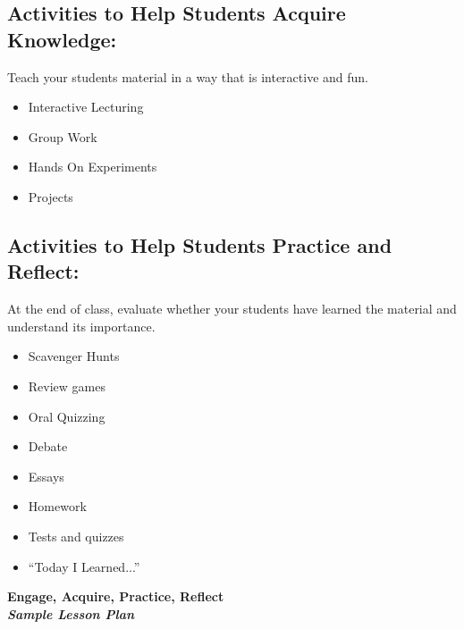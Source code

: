 \subsection{Activities to Help Students Acquire Knowledge:}
Teach your students material in a way that is interactive and fun.  
\begin{itemize}
 \item Interactive Lecturing
 \item Group Work
 \item Hands On Experiments
 \item Projects
\end{itemize}

\subsection{Activities to Help Students Practice and Reflect:}
At the end of class, evaluate whether your students have learned the material and understand its importance.
\begin{itemize}
 \item Scavenger Hunts
 \item Review games
 \item Oral Quizzing
 \item Debate
 \item Essays
 \item Homework
 \item Tests and quizzes
 \item ``Today I Learned...''
\end{itemize}

\newpage
\begin{center}
\textbf{Engage, Acquire, Practice, Reflect\\ \textit{Sample Lesson Plan}}\\
\end{center}
\textbf{\textit{ }}\\

